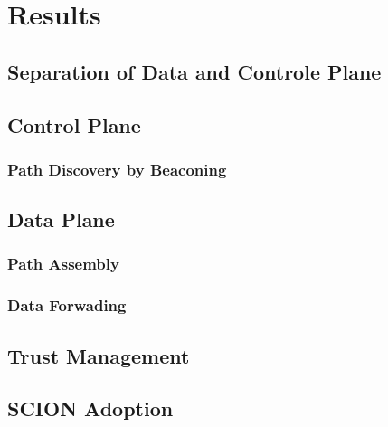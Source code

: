 \documentclass[../eva1_scion.tex]{subfiles}
\begin{document}
    \chapter{Results}
    
    \section{Separation of Data and Controle Plane}
    
    \section{Control Plane}
    \subsection{Path Discovery by Beaconing}
    \section{Data Plane}

    \subsection{Path Assembly}
    \subsection{Data Forwading}
    
    \section{Trust Management}
    
    \section{SCION Adoption}
\end{document}
